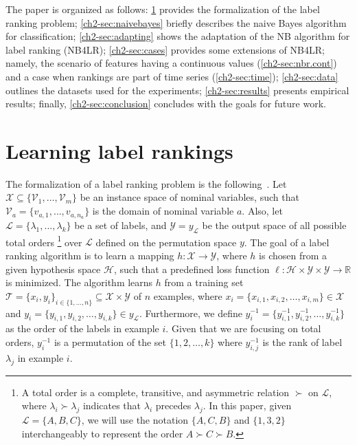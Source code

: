 \documentclass[a4paper,twoside,12pt,openright,notitlepage]{report}\usepackage[]{graphicx}\usepackage[]{color}
\begin{document}
The paper is organized as follows: \ref{ch2-sec:learning} provides the formalization of the label ranking problem; \ref{ch2-sec:naivebayes} briefly  describes the naive Bayes algorithm for classification; \ref{ch2-sec:adapting} shows the adaptation of the NB algorithm for label ranking (NB4LR); \ref{ch2-sec:cases} provides some extensions of NB4LR; namely, the scenario of features having a continuous values (\ref{ch2-sec:nbr.cont})  and a case when rankings are part of time series (\ref{ch2-sec:time}); \ref{ch2-sec:data} outlines the datasets used for the experiments;
\ref{ch2-sec:results} presents empirical results; finally, \ref{ch2-sec:conclusion} concludes with the goals for future work.

 \section{Learning label rankings}
 \label{ch2-sec:learning}

The formalization of a label ranking problem is the following~\citep{vembu2009}. Let $\mathcal{X} \subseteq \{\mathcal{V}_1,\ldots,\mathcal{V}_m\}$ be an instance space of nominal variables, such that $\mathcal{V}_a=\{v_{a,1}, \ldots, v_{a,n_a}\}$ is the domain of nominal variable $a$.  Also, let $\mathcal{L} = \{\lambda_1,\ldots,\lambda_k\}$ be a set of labels, and $\mathcal{Y} = y_{\mathcal{L}}$ be the output space of all possible total orders%
\footnote{A total order is a complete, transitive, and asymmetric relation $\succ$ on $\mathcal{L}$, where $\lambda_i \succ \lambda_j$ indicates that $\lambda_i$ precedes $\lambda_j$. In this paper, given $\mathcal{L}=\{A,B,C\}$, we will use the notation $\{A,C,B\}$ and $\{1,3,2\}$ interchangeably to represent the order $A \succ C \succ B$.} over $\mathcal{L}$ defined on the permutation space $y$. The goal of a label ranking algorithm is to learn a mapping $h: \mathcal{X} \rightarrow \mathcal{Y}$, where $h$ is chosen from a given hypothesis space $\mathcal{H}$, such that a predefined loss function $\ell: \mathcal{H} \times \mathcal{Y} \times \mathcal{Y} \rightarrow \mathbb{R}$ is minimized. The algorithm learns $h$ from a training set $\mathcal{T}=\{x_i,y_i\}_{i \in \{1, \ldots, n\}} \subseteq \mathcal{X} \times \mathcal{Y}$ of $n$ examples, where $x_i = \{x_{i,1}, x_{i,2}, \ldots, x_{i,m} \} \in \mathcal{X}$ and $ y_i = \{y_{i,1}, y_{i,2}, \dots, y_{i,k}\} \in y_{\mathcal{L}}$. Furthermore, we define $y_i^{-1} = \{y_{i,1}^{-1}, y_{i,2}^{-1}, \ldots, y_{i,k}^{-1}\}$ as the order of the labels in example $i$. Given that we are focusing on total orders, $y_i^{-1}$ is a permutation of the set $\{1, 2, \ldots, k\}$ where $y_{i,j}^{-1}$ is the rank of label $\lambda_j$ in example $i$.
\end{document}
